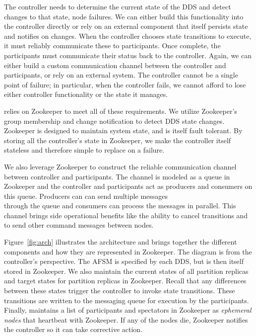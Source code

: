 The controller needs to determine the current state of the DDS and detect
changes to that state, \eg node failures.  We can either build this
functionality into the controller directly or rely on an external component that
itself persists state and notifies on changes. 
When the controller chooses state transitions to execute, it must reliably
communicate these to participants.  Once complete, the participants must
communicate their status back to the controller.  Again, we can either build a
custom communication channel between the controller and participants, or rely on an
external system. 
The controller cannot be a single point of failure; in particular, when the
controller fails, we cannot afford to lose either controller functionality or
the state it manages.

\helix relies on Zookeeper to meet all of these requirements.  We utilize
Zookeeper's group membership and change notification to detect DDS state
changes.  Zookeeper is
designed to maintain system state, and is itself fault tolerant.  By storing
all the controller's state in Zookeeper, we make the controller itself stateless
and therefore simple to replace on a failure.  
 
We also leverage Zookeeper to construct the reliable communication channel
between controller and participants.  
The channel is modeled as a queue in Zookeeper and the controller and
participants act as producers and consumers on this queue. Producers can
can send multiple messages \\ through the queue and consumers can process the messages in parallel. 
This channel brings side
operational benefits like the ability to cancel transitions and to send other command messages between nodes.

Figure~\ref{fig:arch} illustrates the \helix architecture and brings together
the different components and how they are represented in Zookeeper.  
The diagram is from the controller's perspective.  The AFSM is specified by each
DDS, but is then itself stored in Zookeeper.  We also maintain the current
states of all partition replicas and target states for partition replicas in
Zookeeper.  Recall that any differences between these states trigger the
controller to invoke state transitions.  These transitions are written to
the messaging queue for execution by the participants.  Finally, \helix
maintains a list of participants and spectators in 
Zookeeper as \emph{ephemeral nodes} that heartbeat with Zookeeper.  If any of
the nodes die, Zookeeper notifies the controller so it can take corrective
action.

